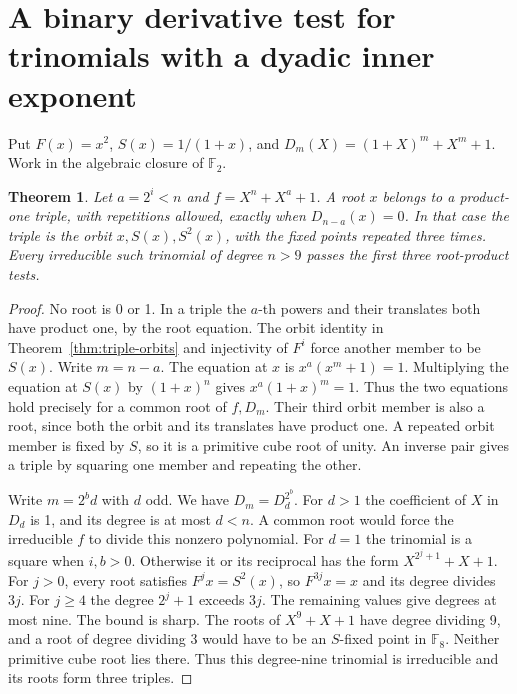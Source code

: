 \documentclass[11pt]{article}
\newtheorem{theorem}{Theorem}
\newcommand{\F}{\mathbb F_2}
\begin{document}
\section{A binary derivative test for trinomials with a dyadic inner exponent}
Put \(F(x)=x^2\), \(S(x)=1/(1+x)\), and
\(D_m(X)=(1+X)^m+X^m+1\). Work in the algebraic closure of \(\F\).
\begin{theorem}\label{thm:tap-derivative}
Let \(a=2^i<n\) and \(f=X^n+X^a+1\). A root \(x\) belongs to
a product-one triple, with repetitions allowed, exactly when
\(D_{n-a}(x)=0\). In that case the triple is the orbit
\(x,S(x),S^2(x)\), with the fixed points repeated three times.
Every irreducible such trinomial of degree \(n>9\) passes the first
three root-product tests.
\end{theorem}
\begin{proof}
No root is 0 or 1. In a triple the \(a\)-th powers and their translates
both have product one, by the root equation. The orbit identity in
Theorem~\ref{thm:triple-orbits} and injectivity of \(F^i\) force another
member to be \(S(x)\). Write \(m=n-a\). The equation at \(x\) is
\(x^a(x^m+1)=1\). Multiplying the equation at \(S(x)\) by
\((1+x)^n\) gives \(x^a(1+x)^m=1\). Thus the two equations hold
precisely for a common root of \(f,D_m\). Their third orbit member is
also a root, since both the orbit and its translates have product one.
A repeated orbit member is fixed by \(S\), so it is a primitive cube
root of unity. An inverse pair gives a triple by squaring one member
and repeating the other.

Write \(m=2^b d\) with \(d\) odd. We have \(D_m=D_d^{2^b}\).
For \(d>1\) the coefficient of \(X\) in \(D_d\) is 1, and its degree
is at most \(d<n\). A common root would force the irreducible \(f\)
to divide this nonzero polynomial. For \(d=1\) the trinomial is a
square when \(i,b>0\). Otherwise it or its reciprocal has the form
\(X^{2^j+1}+X+1\). For \(j>0\), every root satisfies
\(F^j x=S^2(x)\), so \(F^{3j}x=x\) and its degree divides \(3j\).
For \(j\ge4\) the degree \(2^j+1\) exceeds \(3j\). The remaining
values give degrees at most nine. The bound is sharp. The roots
of \(X^9+X+1\) have degree dividing 9, and a root of degree
dividing 3 would have to be an \(S\)-fixed point in \(\mathbb F_8\).
Neither primitive cube root lies there. Thus this degree-nine
trinomial is irreducible and its roots form three triples.
\end{proof}
\end{document}
